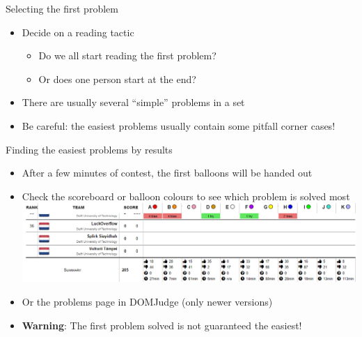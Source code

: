 \documentclass[11pt,pdf, aspectratio=169]{beamer}
\begin{document}
  \begin{frame}{Selecting the first problem}
    \begin{itemize}
      \item Decide on a reading tactic
      \begin{itemize}
        \item Do we all start reading the first problem?
        \item Or does one person start at the end?
      \end{itemize}
      \item There are usually several ``simple'' problems in a set
      \item Be careful: the easiest problems usually contain some pitfall corner cases!
    \end{itemize}
  \end{frame}
  \begin{frame}{Finding the easiest problems by results}
    \begin{itemize}
      \item After a few minutes of contest, the first balloons will be handed out
      \item Check the scoreboard or balloon colours to see which problem is solved most\\
      \includegraphics[width=\linewidth]{images/session-2/bottom-scoreboard}
      \item Or the problems page in DOMJudge (only newer versions)
      \item \textbf{Warning}: The first problem solved is not guaranteed the easiest!
    \end{itemize}
  \end{frame}
\end{document}
